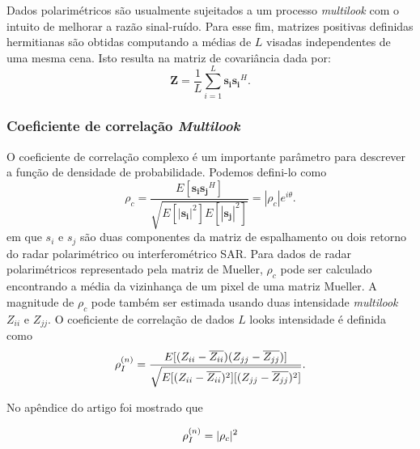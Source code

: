 \documentclass[12pt,a4paper]{article}
\begin{document}
Dados polarimétricos são usualmente sujeitados a um processo {\it multilook} com o intuito de melhorar a razão sinal-ruído.
Para esse fim, matrizes positivas definidas hermitianas são obtidas computando a médias de $L$ visadas 
independentes de uma mesma cena. Isto resulta na matriz de covariância {} dada por:
\begin{equation}\label{eqn7}
	\mathbf{Z}=\frac{1}{L}\sum_{i=1}^{L} \mathbf{s_is_i}^H .
\end{equation}

\subsubsection{Coeficiente de correlação {\it Multilook}}

O coeficiente de correlação complexo é um importante parâmetro para descrever a função de densidade de probabilidade. 
Podemos defini-lo como
\begin{equation}\label{eqn8}
	\rho_c=\frac{E[\mathbf{s_is_j}^H]}{\sqrt{E[|\mathbf{s_i}|^2]E[|\mathbf{s_j}|^2]}} =|\rho_c|e^{i\theta}.
\end{equation}
em que {\boldmath $s_i$} e {\boldmath $s_j$} 
são duas componentes da matriz de espalhamento ou dois retorno do radar polarimétrico ou interferométrico SAR. 
Para dados de radar polarimétricos representado pela matriz de Mueller, $\rho_c$ pode ser calculado encontrando a média da vizinhança de um pixel de uma matriz Mueller. A magnitude de $\rho_c$ pode também ser estimada usando duas intensidade  {\it multilook} $Z_{ii}$ e $Z_{jj}$. O coeficiente de correlação de dados $L$ looks intensidade é definida como   
\begin{equation}\label{eqn9}
	\rho_I^{(n)}=\frac{E[(Z_{ii}-\overline{Z_{ii}})(Z_{jj}-\overline{Z_{jj}})]}{\sqrt{E[(Z_{ii}-\overline{Z_{ii}})^2][(Z_{jj}-\overline{Z_{jj}})^2]}}. \\
\end{equation}

No apêndice do artigo \cite{lee94} foi mostrado que 

\begin{equation}\label{eqn10}
	\rho_I^{(n)}= |\rho_c|^2\\
\end{equation}
\end{document}
